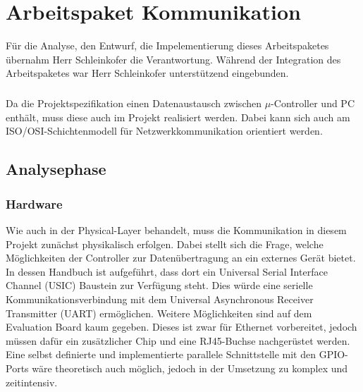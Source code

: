 \graphicspath{{./communication/}}
\chapter{Arbeitspaket Kommunikation}
Für die Analyse, den Entwurf, die Impelementierung dieses Arbeitspaketes übernahm Herr Schleinkofer die Verantwortung. Während der Integration des Arbeitspaketes war Herr Schleinkofer unterstützend eingebunden.
\paragraph{}
Da die Projektspezifikation einen Datenaustausch zwischen $\mu$-Controller und PC enthält, muss diese auch im Projekt realisiert werden. Dabei kann sich auch am ISO/OSI-Schichtenmodell für Netzwerkkommunikation orientiert werden.
\section{Analysephase}
\subsection{Hardware}
Wie auch in der Physical-Layer behandelt, muss die Kommunikation in diesem Projekt zunächst physikalisch erfolgen. 
Dabei stellt sich die Frage, welche Möglichkeiten der Controller zur Datenübertragung an ein externes Gerät bietet. In dessen Handbuch ist aufgeführt, dass dort ein Universal Serial Interface Channel (USIC) Baustein zur Verfügung steht. Dies würde eine serielle Kommunikationsverbindung mit dem Universal Asynchronous Receiver Transmitter (UART) ermöglichen. Weitere Möglichkeiten sind auf dem Evaluation Board kaum gegeben. Dieses ist zwar für Ethernet vorbereitet, jedoch müssen dafür ein zusätzlicher Chip und eine RJ45-Buchse nachgerüstet werden. Eine selbst definierte und implementierte parallele Schnittstelle mit den GPIO-Ports wäre theoretisch auch möglich, jedoch in der Umsetzung zu komplex und zeitintensiv.
